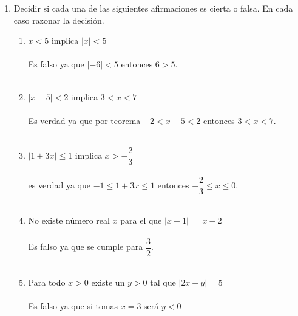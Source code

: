 \begin{enumerate}[ \bfseries 1.]
\item Decidir si cada una de las siguientes afirmaciones es cierta o falsa. En cada caso razonar la decisión.
\begin{enumerate}[\bfseries (a)]
\item $x<5$ implica $|x|<5$\\\\
Es falso ya que $|-6|<5$ entonces $6>5$.\\\\
\item $|x-5|<2$ implica $3<x<7$\\\\
Es verdad ya que por teorema $-2 < x-5 < 2$ entonces $3<x<7$.\\\\
\item $|1 + 3x| \leq 1$ implica $x > - \dfrac{2}{3}$ \\\\
es verdad ya que $-1\leq 1 + 3x \leq 1$ entonces $-\dfrac{2}{3} \leq x \leq 0$.\\\\
\item No existe número real $x$ para el que $|x-1|= |x-2|$\\\\
Es falso ya que se cumple para $\dfrac{3}{2}$.\\\\
\item Para todo $x>0$ existe un $y>0$ tal que $|2x + y|=5$\\\\
Es falso ya que si tomas $x=3$ será $y<0$\\\\
\end{enumerate}


\end{enumerate}
